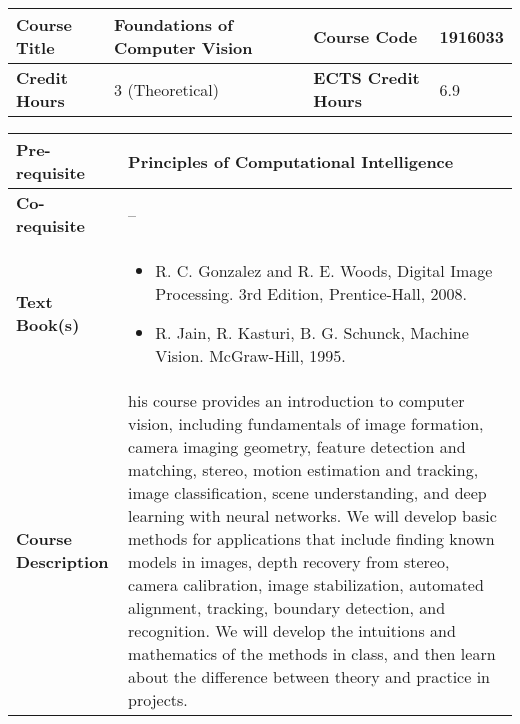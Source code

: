 \documentclass[12pt]{article}
\begin{document}
\bigskip
\bigskip

\begin{minipage}{\textwidth}
\begin{tabularx}{\textwidth}{|l|X|l|X|}
\hline
\textbf{Course Title}       &  Foundations of Computer Vision & \textbf{Course Code}       &  1916033 \\ \hline
\textbf{Credit Hours}       &  3 (Theoretical) & \textbf{ECTS Credit Hours}       &  6.9 \\ \hline
\end{tabularx}

\begin{tabularx}{\textwidth}{|l|X|}
\hline
\textbf{Pre-requisite}      &   Principles of Computational Intelligence \\ \hline
\textbf{Co-requisite}       &  -- \\ \hline
\textbf{Text Book(s)}      & \begin{minipage}{.70\textwidth}
					\begin{itemize} \itemsep-0.4em
						\vspace{3mm}
						\item R. C. Gonzalez and R. E. Woods, Digital Image Processing. 3rd Edition, Prentice-Hall, 2008.
						\item R. Jain, R. Kasturi, B. G. Schunck, Machine Vision. McGraw-Hill, 1995.
						\vspace{3mm}
					\end{itemize}
				\end{minipage}  \\ \hline
\textbf{Course Description} & \begin{minipage}{.70\textwidth}
					\vspace{3mm}
					his course provides an introduction to computer vision, including fundamentals of image formation, camera imaging geometry, feature detection and matching, stereo, motion estimation and tracking, image classification, scene understanding, and deep learning with neural networks. We will develop basic methods for applications that include finding known models in images, depth recovery from stereo, camera calibration, image stabilization, automated alignment, tracking, boundary detection, and recognition. We will develop the intuitions and mathematics of the methods in class, and then learn about the difference between theory and practice in projects.

					\vspace{3mm}
					\end{minipage} \\ \hline
\end{tabularx}
\end{minipage}
\end{document}
